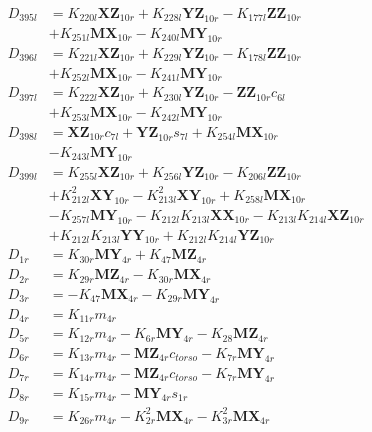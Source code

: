 \begin{multicols}{2}
\begin{align}
D_{395l} &= K_{220l}\mathbf{XZ}_{10r} + K_{228l}\mathbf{YZ}_{10r} - K_{177l}\mathbf{ZZ}_{10r}  \nonumber \\
&+ K_{251l}\mathbf{MX}_{10r} - K_{240l}\mathbf{MY}_{10r} \nonumber \\
D_{396l} &= K_{221l}\mathbf{XZ}_{10r} + K_{229l}\mathbf{YZ}_{10r} - K_{178l}\mathbf{ZZ}_{10r}  \nonumber \\
&+ K_{252l}\mathbf{MX}_{10r} - K_{241l}\mathbf{MY}_{10r} \nonumber \\
D_{397l} &= K_{222l}\mathbf{XZ}_{10r} + K_{230l}\mathbf{YZ}_{10r} - \mathbf{ZZ}_{10r}c_{6l}  \nonumber \\
&+ K_{253l}\mathbf{MX}_{10r} - K_{242l}\mathbf{MY}_{10r} \nonumber \\
D_{398l} &= \mathbf{XZ}_{10r}c_{7l} + \mathbf{YZ}_{10r}s_{7l} + K_{254l}\mathbf{MX}_{10r}  \nonumber \\
&- K_{243l}\mathbf{MY}_{10r} \nonumber \\
D_{399l} &= K_{255l}\mathbf{XZ}_{10r} + K_{256l}\mathbf{YZ}_{10r} - K_{206l}\mathbf{ZZ}_{10r}  \nonumber \\
&+ K_{212l}^2\mathbf{XY}_{10r} - K_{213l}^2\mathbf{XY}_{10r} + K_{258l}\mathbf{MX}_{10r}  \nonumber \\
&- K_{257l}\mathbf{MY}_{10r} - K_{212l}K_{213l}\mathbf{XX}_{10r} - K_{213l}K_{214l}\mathbf{XZ}_{10r}  \nonumber \\
&+ K_{212l}K_{213l}\mathbf{YY}_{10r} + K_{212l}K_{214l}\mathbf{YZ}_{10r} \nonumber \\
D_{1r} &= K_{30r}\mathbf{MY}_{4r} + K_{47}\mathbf{MZ}_{4r} \nonumber \\
D_{2r} &= K_{29r}\mathbf{MZ}_{4r} - K_{30r}\mathbf{MX}_{4r} \nonumber \\
D_{3r} &= - K_{47}\mathbf{MX}_{4r} - K_{29r}\mathbf{MY}_{4r} \nonumber \\
D_{4r} &= K_{11r}m_{4r} \nonumber \\
D_{5r} &= K_{12r}m_{4r} - K_{6r}\mathbf{MY}_{4r} - K_{28}\mathbf{MZ}_{4r} \nonumber \\
D_{6r} &= K_{13r}m_{4r} - \mathbf{MZ}_{4r}c_{torso} - K_{7r}\mathbf{MY}_{4r} \nonumber \\
D_{7r} &= K_{14r}m_{4r} - \mathbf{MZ}_{4r}c_{torso} - K_{7r}\mathbf{MY}_{4r} \nonumber \\
D_{8r} &= K_{15r}m_{4r} - \mathbf{MY}_{4r}s_{1r} \nonumber \\
D_{9r} &= K_{26r}m_{4r} - K_{2r}^2\mathbf{MX}_{4r} - K_{3r}^2\mathbf{MX}_{4r}  \nonumber \\

\end{align}
\end{multicols}
